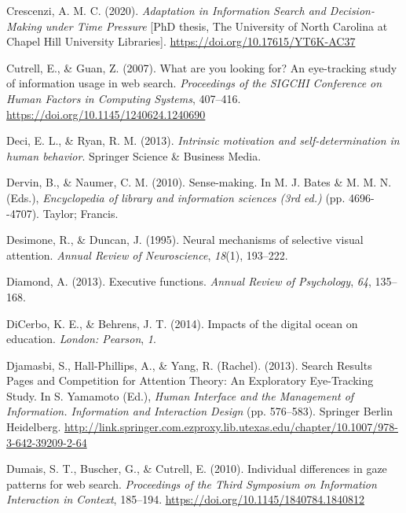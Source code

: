 \documentclass[letterpaper, nobind]{templates/ociamthesis}
\newlength{\cslhangindent}
\newenvironment{CSLReferences}[2] %
 {%
  \setlength{\parindent}{0pt}
  \ifodd #1
  \let\oldpar\par
  \def\par{\hangindent=\cslhangindent\oldpar}
  \fi
  \setlength{\parskip}{1mm}
  \setlength{\baselineskip}{6mm}
 }%
 {}
\begin{document}
\begin{CSLReferences}{1}{0}
\leavevmode{}%
Crescenzi, A. M. C. (2020). \emph{Adaptation in {Information Search} and {Decision}-{Making} under {Time Pressure}} {[}PhD thesis, The University of North Carolina at Chapel Hill University Libraries{]}. \url{https://doi.org/10.17615/YT6K-AC37}

\leavevmode{}%
Cutrell, E., \& Guan, Z. (2007). What are you looking for? {An} eye-tracking study of information usage in web search. \emph{Proceedings of the {SIGCHI} Conference on Human Factors in Computing Systems}, 407--416. \url{https://doi.org/10.1145/1240624.1240690}

\leavevmode{}%
Deci, E. L., \& Ryan, R. M. (2013). \emph{Intrinsic motivation and self-determination in human behavior}. Springer Science \& Business Media.

\leavevmode{}%
Dervin, B., \& Naumer, C. M. (2010). Sense-making. In M. J. Bates \& M. M. N. (Eds.), \emph{Encyclopedia of library and information sciences (3rd ed.)} (pp. 4696-\/-4707). Taylor; Francis.

\leavevmode{}%
Desimone, R., \& Duncan, J. (1995). Neural mechanisms of selective visual attention. \emph{Annual Review of Neuroscience}, \emph{18}(1), 193--222.

\leavevmode{}%
Diamond, A. (2013). Executive functions. \emph{Annual Review of Psychology}, \emph{64}, 135--168.

\leavevmode{}%
DiCerbo, K. E., \& Behrens, J. T. (2014). Impacts of the digital ocean on education. \emph{London: Pearson}, \emph{1}.

\leavevmode{}%
Djamasbi, S., Hall-Phillips, A., \& Yang, R. (Rachel). (2013). Search {Results Pages} and {Competition} for {Attention Theory}: {An Exploratory Eye}-{Tracking Study}. In S. Yamamoto (Ed.), \emph{Human {Interface} and the {Management} of {Information}. {Information} and {Interaction Design}} (pp. 576--583). {Springer Berlin Heidelberg}. \url{http://link.springer.com.ezproxy.lib.utexas.edu/chapter/10.1007/978-3-642-39209-2-64}

\leavevmode{}%
Dumais, S. T., Buscher, G., \& Cutrell, E. (2010). Individual differences in gaze patterns for web search. \emph{Proceedings of the Third Symposium on Information Interaction in Context}, 185--194. \url{https://doi.org/10.1145/1840784.1840812}


\end{CSLReferences}
\end{document}
